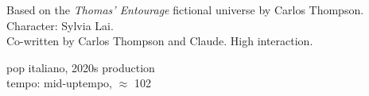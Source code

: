 
\label{sec:resto-qui}

\begin{notes}
Based on the \emph{Thomas’ Entourage} fictional universe by Carlos Thompson.\\
Character: Sylvia Lai.\\
Co-written by Carlos Thompson and Claude. %
High interaction.
\end{notes}

\begin{style}
pop italiano, 2020s production\\
tempo: mid-uptempo, \quarternote\(\approx\) 102
\end{style}

